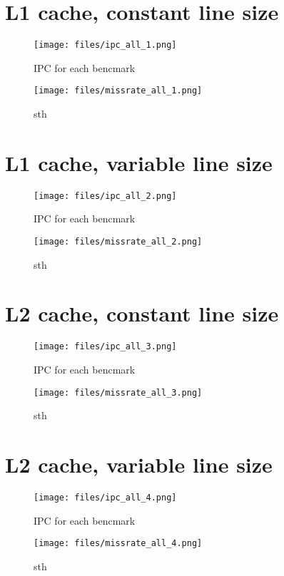 \documentclass[a4paper,9pt]{article}
\begin{document}
\def\thesection {\roman{section}: }



\section{L1 cache, constant line size}
\begin{figure}[H]
    \texttt{[image: files/ipc\_all\_1.png]}
    \caption{IPC for each bencmark}
\end{figure}

\begin{figure}[H]
    \texttt{[image: files/missrate\_all\_1.png]}
    \caption{sth}
\end{figure}

\section{L1 cache, variable line size}
\begin{figure}[H]
    \texttt{[image: files/ipc\_all\_2.png]}
    \caption{IPC for each bencmark}
\end{figure}

\begin{figure}[H]
    \texttt{[image: files/missrate\_all\_2.png]}
    \caption{sth}
\end{figure}

\section{L2 cache, constant line size}
\begin{figure}[H]
    \texttt{[image: files/ipc\_all\_3.png]}
    \caption{IPC for each bencmark}
\end{figure}

\begin{figure}[H]
    \texttt{[image: files/missrate\_all\_3.png]}
    \caption{sth}
\end{figure}

\section{L2 cache, variable line size}
\begin{figure}[H]
    \texttt{[image: files/ipc\_all\_4.png]}
    \caption{IPC for each bencmark}
\end{figure}

\begin{figure}[H]
    \texttt{[image: files/missrate\_all\_4.png]}
    \caption{sth}
\end{figure}
\end{document}
